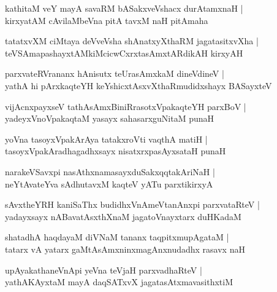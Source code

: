\begin{shloka}
kathitaM veY mayA savaRM bASakxveVshacx durAtamxnaH |\\
kirxyatAM cAvilaMbeVna pitA tavxM naH pitAmaha
\end{shloka}

\begin{shloka}
tatatxvXM ciMtaya deVveVsha shAnatxyXthaRM jagatasitxvXha |\\
teVSAmapashayxtAMkiMcicwCxrxtasAmxtARdikAH kirxyAH 
\end{shloka}

\begin{shloka}
parxvateRVrananx hAnisutx teUrasAmxkaM dineVdineV |\\
yathA hi pArxkaqteYH keYshicxtAsxvXthaRmudidxshayx BASayxteV
\end{shloka}

\begin{shloka}
vijAcnxpayxseV tathAsAmxBiniRrasotxVpakaqteYH parxBoV |\\
yadeyxVnoVpakaqtaM yasayx sahasarxguNitaM punaH
\end{shloka}

\begin{shloka}
yoVna tasoyxVpakArAya tatakxroVti vaqthA matiH |\\
tasoyxVpakAradhagadhxsayx nisatxrxpasAyxsataH punaH
\end{shloka}

\begin{shloka}
narakeVSavxpi nasAthxnamasayxduSakxqqtakAriNaH |\\
neYtAvateYva sAdhutavxM kaqteV yATu parxtikirxyA
\end{shloka}

\begin{shloka}
sAvxtheYRH kaniSaThx budidhxVnAmeVtanAnxpi parxvataRteV |\\
yadayxsayx nABavatAsxthXnaM jagatoVnayxtarx duHKadaM
\end{shloka}

\begin{shloka}
shatadhA haqdayaM diVNaM tananx taqpitxmupAgataM |\\
tatarx vA yatarx gaMtAsAmxninxmagAnxnudadhx rasavx naH 
\end{shloka}

\begin{shloka}
upAyakathaneVnApi yeVna teVjaH parxvadhaRteV |\\
yathAKAyxtaM mayA daqSATxvX jagatasAtxmavasithxtiM
\end{shloka}

